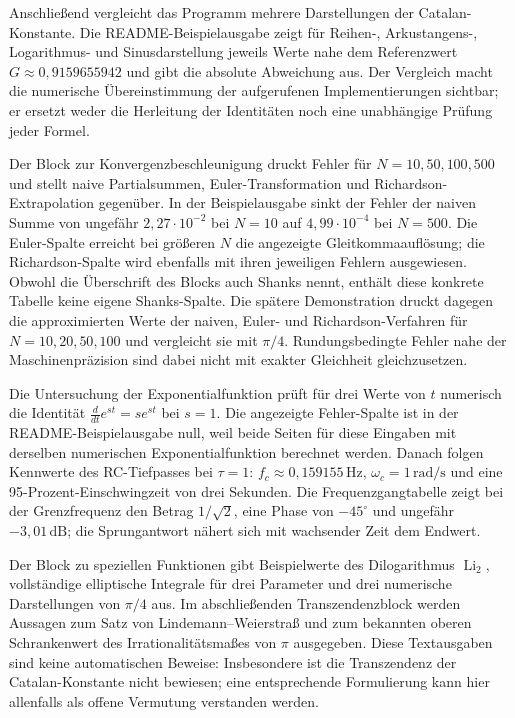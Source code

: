 \documentclass[a4paper,12pt,twoside]{report}
\theoremstyle{definition}
\begin{document}
Anschließend vergleicht das Programm mehrere Darstellungen der Catalan-Konstante. Die README-Beispielausgabe zeigt für Reihen-, Arkustangens-, Logarithmus- und Sinusdarstellung jeweils Werte nahe dem Referenzwert $G\approx0{,}9159655942$ und gibt die absolute Abweichung aus. Der Vergleich macht die numerische Übereinstimmung der aufgerufenen Implementierungen sichtbar; er ersetzt weder die Herleitung der Identitäten noch eine unabhängige Prüfung jeder Formel.

Der Block zur Konvergenzbeschleunigung druckt Fehler für $N=10,50,100,500$ und stellt naive Partialsummen, Euler-Transformation und Richardson-Extrapolation gegenüber. In der Beispielausgabe sinkt der Fehler der naiven Summe von ungefähr $2{,}27\cdot10^{-2}$ bei $N=10$ auf $4{,}99\cdot10^{-4}$ bei $N=500$. Die Euler-Spalte erreicht bei größeren $N$ die angezeigte Gleitkommaauflösung; die Richardson-Spalte wird ebenfalls mit ihren jeweiligen Fehlern ausgewiesen. Obwohl die Überschrift des Blocks auch Shanks nennt, enthält diese konkrete Tabelle keine eigene Shanks-Spalte. Die spätere Demonstration druckt dagegen die approximierten Werte der naiven, Euler- und Richardson-Verfahren für $N=10,20,50,100$ und vergleicht sie mit $\pi/4$. Rundungsbedingte Fehler nahe der Maschinenpräzision sind dabei nicht mit exakter Gleichheit gleichzusetzen.

Die Untersuchung der Exponentialfunktion prüft für drei Werte von $t$ numerisch die Identität $\frac{d}{dt}e^{st}=s e^{st}$ bei $s=1$. Die angezeigte Fehler-Spalte ist in der README-Beispielausgabe null, weil beide Seiten für diese Eingaben mit derselben numerischen Exponentialfunktion berechnet werden. Danach folgen Kennwerte des RC-Tiefpasses bei $\tau=1$: $f_c\approx0{,}159155\,\mathrm{Hz}$, $\omega_c=1\,\mathrm{rad/s}$ und eine 95-Prozent-Einschwingzeit von drei Sekunden. Die Frequenzgangtabelle zeigt bei der Grenzfrequenz den Betrag $1/\sqrt{2}$, eine Phase von $-45^\circ$ und ungefähr $-3{,}01\,\mathrm{dB}$; die Sprungantwort nähert sich mit wachsender Zeit dem Endwert.

Der Block zu speziellen Funktionen gibt Beispielwerte des Dilogarithmus $\operatorname{Li}_2$, vollständige elliptische Integrale für drei Parameter und drei numerische Darstellungen von $\pi/4$ aus. Im abschließenden Transzendenzblock werden Aussagen zum Satz von Lindemann--Weierstraß und zum bekannten oberen Schrankenwert des Irrationalitätsmaßes von $\pi$ ausgegeben. Diese Textausgaben sind keine automatischen Beweise: Insbesondere ist die Transzendenz der Catalan-Konstante nicht bewiesen; eine entsprechende Formulierung kann hier allenfalls als offene Vermutung verstanden werden.
\end{document}
